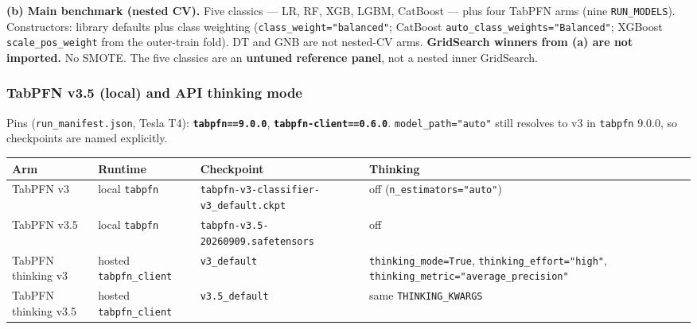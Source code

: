 \documentclass[
]{article}
\newcounter{none} %
\begin{document}
\textbf{(b) Main benchmark (nested CV).} Five classics --- LR, RF, XGB,
LGBM, CatBoost --- plus four TabPFN arms (nine \texttt{RUN\_MODELS}).
Constructors: library defaults plus class weighting
(\texttt{class\_weight="balanced"}; CatBoost
\texttt{auto\_class\_weights="Balanced"}; XGBoost
\texttt{scale\_pos\_weight} from the outer-train fold). DT and GNB are
not nested-CV arms. \textbf{GridSearch winners from (a) are not
imported.} No SMOTE. The five classics are an \textbf{untuned reference
panel}, not a nested inner GridSearch.

\subsubsection{TabPFN v3.5 (local) and API thinking
mode}\label{tabpfn-v3.5-local-and-api-thinking-mode}

Pins (\texttt{run\_manifest.json}, Tesla T4):
\textbf{\texttt{tabpfn==9.0.0}}, \textbf{\texttt{tabpfn-client==0.6.0}}.
\texttt{model\_path="auto"} still resolves to v3 in \texttt{tabpfn}
9.0.0, so checkpoints are named explicitly.

{\def\LTcaptype{none} %
\begin{longtable}[]{@{}
  >{\raggedright\arraybackslash}p{}
  >{\raggedright\arraybackslash}p{}
  >{\raggedright\arraybackslash}p{}
  >{\raggedright\arraybackslash}p{}@{}}
\toprule\noalign{}
\begin{minipage}[b]{\linewidth}\raggedright
Arm
\end{minipage} & \begin{minipage}[b]{\linewidth}\raggedright
Runtime
\end{minipage} & \begin{minipage}[b]{\linewidth}\raggedright
Checkpoint
\end{minipage} & \begin{minipage}[b]{\linewidth}\raggedright
Thinking
\end{minipage} \\
\midrule\noalign{}
\endhead
\bottomrule\noalign{}
\endlastfoot
TabPFN v3 & local \texttt{tabpfn} &
\texttt{tabpfn-v3-classifier-v3\_default.ckpt} & off
(\texttt{n\_estimators="auto"}) \\
TabPFN v3.5 & local \texttt{tabpfn} &
\texttt{tabpfn-v3.5-20260909.safetensors} & off \\
TabPFN thinking v3 & hosted \texttt{tabpfn\_client} &
\texttt{v3\_default} & \texttt{thinking\_mode=True},
\texttt{thinking\_effort="high"},
\texttt{thinking\_metric="average\_precision"} \\
TabPFN thinking v3.5 & hosted \texttt{tabpfn\_client} &
\texttt{v3.5\_default} & same \texttt{THINKING\_KWARGS} \\
\end{longtable}
}
\end{document}
